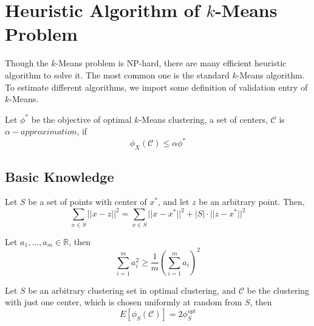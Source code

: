 	\section{Heuristic Algorithm of $k$-Means Problem}\label{alo:Heuristic}
	Though the $k$-Means problem is NP-hard, there are many efficient heuristic algorithm to solve it. The most common one is the standard $k$-Means algorithm. To estimate different algorithms, we import some definition of validation entry of $k$-Means.
	\begin{definition}
	Let $\phi^{*}$ be the objective of optimal $k$-Means clustering, a set of centers, $\mathcal{C}$ is $\alpha-approximation$, if 
	\begin{equation}
	\phi_{X}(\mathcal{C}) \leq \alpha \phi^{*}
	\end{equation}
	\end{definition}
	
	\subsection{Basic Knowledge}
	\begin{lemma}
	\label{sum}
	Let $S$ be a set of points with center of $x^{*}$, and let $z$ be an arbitrary point. Then, 
	\begin{equation}
	\sum_{x \in S}||x - z||^{2} = \sum_{x \in S} ||x - x^{*}||^{2} + |S|\cdot ||z - x^{*}||^{2}
	\end{equation}
	\end{lemma}
	
	\begin{lemma}
	Let $a_{1}, \dots, a_{m}\in\mathbb{R}$, then 
	\begin{equation}
	\sum_{i = 1}^{m} a_{i}^{2} \geq \frac{1}{m} \left(\sum_{i = 1}^{m}a_{i}\right)^{2}
	\end{equation}
	\label{powermean}
	
	\end{lemma}
			
	\begin{lemma}
	\label{optle}
	Let $S$ be an arbitrary clustering set in optimal clustering, and $\mathcal{C}$ be the clustering with just one center, which is chosen uniformly at random from $S$, then 
	\begin{equation}
	E[\phi_{S}(\mathcal{C})] = 2 \phi^{opt}_{S} 
	\end{equation}
	\label{powermean}
	
	\end{lemma}


